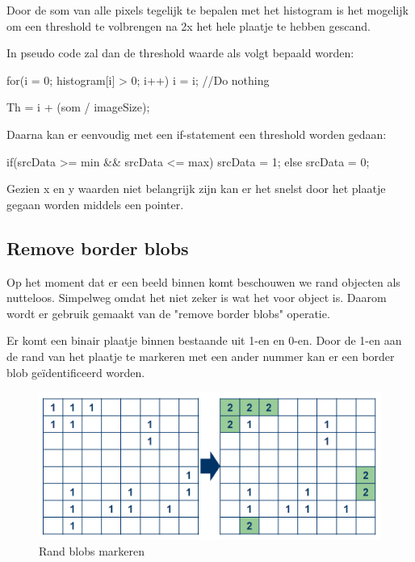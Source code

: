 Door de som van alle pixels tegelijk te bepalen met het histogram is het mogelijk
om een threshold te volbrengen na 2x het hele plaatje te hebben gescand.

In pseudo code zal dan de threshold waarde als volgt bepaald worden:

\begin{cppcode}
    for(i = 0; histogram[i] > 0; i++){
        i = i; //Do nothing
    }

    Th = i + (som / imageSize);
\end{cppcode}

Daarna  kan er eenvoudig met een if-statement een threshold worden gedaan:

\begin{cppcode}
    if(srcData >= min && srcData <= max){
        srcData = 1;
    } else {
        srcData = 0;
    }
\end{cppcode}

Gezien x en y waarden niet belangrijk zijn kan er het snelst door het plaatje
gegaan worden middels een pointer.

\subsection{Remove border blobs}
\label{sub:rembb}

Op het moment dat er een beeld binnen komt beschouwen we rand objecten als
nutteloos. Simpelweg omdat het niet zeker is wat het voor object is. Daarom
wordt er gebruik gemaakt van de "remove border blobs" operatie.

Er komt een binair plaatje binnen bestaande uit 1-en en 0-en. Door de 1-en
aan de rand van het plaatje te markeren met een ander nummer kan er een
border blob geïdentificeerd worden.

\begin{figure}
    \begin{center}
        \includegraphics[scale=0.5]{figures/border_blob_step1.png}
    \end{center}
    \caption{Rand blobs markeren}
    \label{fig:bbstep1}
\end{figure}

